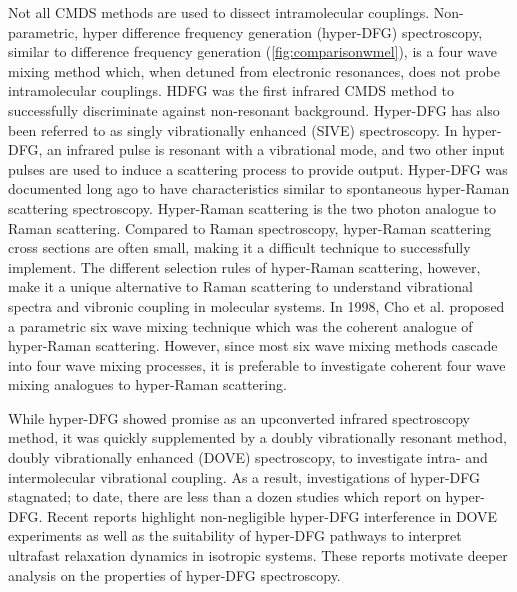 \documentclass[aip, jcp, reprint, onecolumn]{revtex4-2}
\begin{document}
Not all CMDS methods are used to dissect intramolecular couplings.\cite{Shen1987_CPL}
Non-parametric, hyper difference frequency generation (hyper-DFG) spectroscopy, similar to difference frequency generation (\autoref{fig:comparisonwmel}), is a four wave mixing method which, when detuned from  electronic resonances, does not probe intramolecular couplings. 
HDFG was the first infrared CMDS method to successfully discriminate against non-resonant background.\cite{RN351, RN352}
Hyper-DFG has also been referred to as singly vibrationally enhanced (SIVE) spectroscopy. \cite{RN351}
In hyper-DFG, an infrared pulse is resonant with a vibrational mode, and two other input pulses are used to induce a scattering process to provide output.
Hyper-DFG was documented long ago to have characteristics similar to spontaneous hyper-Raman scattering spectroscopy. \cite{RN352}
Hyper-Raman scattering is the two photon analogue to Raman scattering. \cite{Cyvin1965, Terhune1965}
Compared to Raman spectroscopy, hyper-Raman scattering cross sections are often small, making it a difficult technique to successfully implement.\cite{RN515, Kelley2010} 
The different selection rules of hyper-Raman scattering, however, make it a unique alternative to Raman scattering to understand vibrational spectra and vibronic coupling in molecular systems.
In 1998, Cho et al. proposed a parametric six wave mixing technique which was the coherent analogue of hyper-Raman scattering. \cite{Cho1998}
However, since most six wave mixing methods cascade into four wave mixing processes,\cite{RN243, Cho2000_Cascade} it is preferable to investigate coherent four wave mixing analogues to hyper-Raman scattering.

While hyper-DFG showed promise as an upconverted infrared spectroscopy method, it was quickly supplemented by a doubly vibrationally resonant method, doubly vibrationally enhanced (DOVE) spectroscopy, to investigate intra- and intermolecular vibrational coupling. \cite{RN345, RN101, Cho2000}
As a result, investigations of hyper-DFG stagnated; to date, there are less than a dozen studies which report on hyper-DFG. \cite{RN350, RN416, RN351, RN352, RN353, Chen1998, RN362, RN418, Bonn2024, McDonnell2024}
Recent reports highlight non-negligible hyper-DFG interference in DOVE experiments as well as the suitability of hyper-DFG pathways to interpret ultrafast relaxation dynamics in isotropic systems. \cite{Bonn2024, McDonnell2024}
These reports motivate deeper analysis on the properties of hyper-DFG spectroscopy. 
\end{document}
